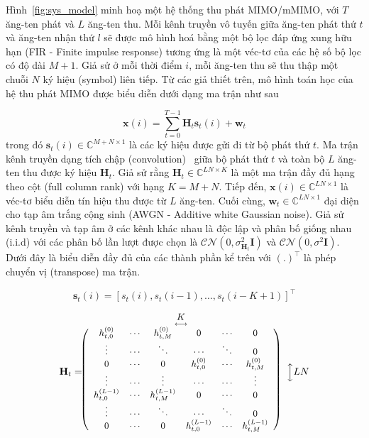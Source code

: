 Hình~\ref{fig:sys_model} minh hoạ một hệ thống thu phát MIMO/mMIMO, với $T$ ăng-ten phát và $L$ ăng-ten thu. Mỗi kênh truyền vô tuyến giữa ăng-ten phát thứ $t$ và ăng-ten nhận thứ $l$ sẽ được mô hình hoá bằng một bộ lọc đáp ứng xung hữu hạn (FIR - Finite impulse response) tương ứng là một véc-tơ của các hệ số bộ lọc có độ dài $M+1$. Giả sử ở mỗi thời điểm $i$, mỗi ăng-ten thu sẽ thu thập một chuỗi $N$ ký hiệu (symbol) liên tiếp. Từ các giả thiết trên, mô hình toán học của hệ thu phát MIMO được biểu diễn dưới dạng ma trận như sau

\begin{equation}
    \mathbf{x}(i) = \sum_{t=0}^{T-1}\mathbf{H}_t \mathbf{s}_t(i) + \mathbf{w}_t
\end{equation}
trong đó $\mathbf{s}_t(i) \in \mathbb{C}^{M+N \times 1}$ là các ký hiệu được gửi đi từ bộ phát thứ $t$. Ma trận kênh truyền dạng tích chập (convolution)~\cite{original} giữa bộ phát thứ $t$ và toàn bộ $L$ ăng-ten thu được ký hiệu $\mathbf{H}_t$. Giả sử rằng $\mathbf{H}_t \in \mathbb{C}^{LN \times K}$ là một ma trận đầy đủ hạng theo cột (full column rank) với hạng $K = M+N$. Tiếp đến, $\mathbf{x}(i) \in \mathbb{C}^{LN \times 1}$ là véc-tơ biểu diễn tín hiệu thu được từ $L$ ăng-ten. Cuối cùng, $\mathbf{w}_t \in \mathbb{C}^{LN \times 1}$ đại diện cho tạp âm trắng cộng sinh (AWGN - Additive white Gaussian noise). Giả sử kênh truyền và tạp âm ở các kênh khác nhau là độc lập và phân bố giống nhau (i.i.d) với các phân bố lần lượt được chọn là $\mathcal{CN}(0, \sigma_{\mathbf{H}_t}^2 \mathbf{I})$ và $\mathcal{CN}(0, \sigma^2 \mathbf{I})$. Dưới đây là biểu diễn đầy đủ của các thành phần kể trên với $(.)^\top$ là phép chuyển vị (transpose) ma trận.

\begin{equation}
    \mathbf{s}_t(i) = [s_t(i), s_t(i-1),\ldots,s_t(i-K+1)]^\top
\end{equation}

\begin{equation}
    \small
    \mathbf{H}_t= \hspace{-0.7cm}
    \begin{array}{cc}
         & \underset{\longleftrightarrow}{K}\\
         & \left(\begin{array}{cccccc}
    h_{t, 0}^{(0)} & \cdots & h_{t, M}^{(0)} & 0 & \cdots & 0 \\
    \vdots & \cdots & \ddots & \cdots & \ddots & 0 \\
    0 & \cdots & 0 & h_{t, 0}^{(0)} & \cdots & h_{t, M}^{(0)} \\
    \vdots & \cdots & \vdots & \cdots & \cdots & \vdots \\
    h_{t, 0}^{(L-1)} & \cdots & h_{t, M}^{(L-1)} & 0 & \cdots & 0 \\
    \vdots & \cdots & \ddots & \cdots & \ddots & 0 \\
    0 & \cdots & 0 & h_{t, 0}^{(L-1)} & \cdots & h_{t, M}^{(L-1)}
    \end{array}
    \right) 
    \end{array}
    \Big\updownarrow LN    
\end{equation}

